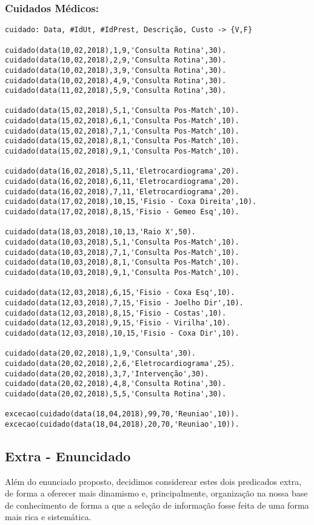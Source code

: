 \documentclass{report}
\begin{document}
\subsubsection{Cuidados Médicos:}
\begin{verbatim}
cuidado: Data, #IdUt, #IdPrest, Descrição, Custo -> {V,F}

cuidado(data(10,02,2018),1,9,'Consulta Rotina',30).
cuidado(data(10,02,2018),2,9,'Consulta Rotina',30).
cuidado(data(10,02,2018),3,9,'Consulta Rotina',30).
cuidado(data(10,02,2018),4,9,'Consulta Rotina',30).
cuidado(data(11,02,2018),5,9,'Consulta Rotina',30).

cuidado(data(15,02,2018),5,1,'Consulta Pos-Match',10).
cuidado(data(15,02,2018),6,1,'Consulta Pos-Match',10).
cuidado(data(15,02,2018),7,1,'Consulta Pos-Match',10).
cuidado(data(15,02,2018),8,1,'Consulta Pos-Match',10).
cuidado(data(15,02,2018),9,1,'Consulta Pos-Match',10).

cuidado(data(16,02,2018),5,11,'Eletrocardiograma',20).
cuidado(data(16,02,2018),6,11,'Eletrocardiograma',20).
cuidado(data(16,02,2018),7,11,'Eletrocardiograma',20).
cuidado(data(17,02,2018),10,15,'Fisio - Coxa Direita',10).
cuidado(data(17,02,2018),8,15,'Fisio - Gemeo Esq',10).

cuidado(data(18,03,2018),10,13,'Raio X',50).
cuidado(data(10,03,2018),5,1,'Consulta Pos-Match',10).
cuidado(data(10,03,2018),7,1,'Consulta Pos-Match',10).
cuidado(data(10,03,2018),8,1,'Consulta Pos-Match',10).
cuidado(data(10,03,2018),9,1,'Consulta Pos-Match',10).

cuidado(data(12,03,2018),6,15,'Fisio - Coxa Esq',10).
cuidado(data(12,03,2018),7,15,'Fisio - Joelho Dir',10).
cuidado(data(12,03,2018),8,15,'Fisio - Costas',10).
cuidado(data(12,03,2018),9,15,'Fisio - Virilha',10).
cuidado(data(12,03,2018),10,15,'Fisio - Coxa Dir',10).

cuidado(data(20,02,2018),1,9,'Consulta',30).
cuidado(data(20,02,2018),2,6,'Eletrocardiograma',25).
cuidado(data(20,02,2018),3,7,'Intervenção',30).
cuidado(data(20,02,2018),4,8,'Consulta Rotina',30).
cuidado(data(20,02,2018),5,5,'Consulta Rotina',30).

excecao(cuidado(data(18,04,2018),99,70,'Reuniao',10)).
excecao(cuidado(data(18,04,2018),20,70,'Reuniao',10)).

\end{verbatim}

\subsection{Extra - Enuncidado}
\bigbreak
Além do enunciado proposto, decidimos considerear estes dois predicados extra, de forma a oferecer mais dinamismo e, principalmente, organização na nossa base de conhecimento de forma a que a seleção de informação fosse feita de uma forma mais rica e sistemática.
\bigbreak
\end{document}
